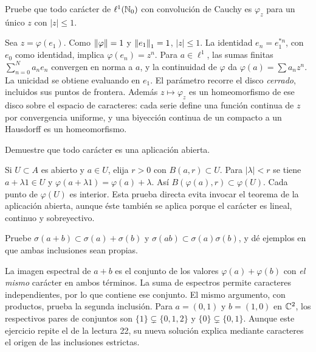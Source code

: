 \begin{ejercicio}\label{ej:v3-l24-2}
Pruebe que todo carácter de $\ell^1(\mathbb N_0)$ con convolución de Cauchy es $\varphi_z$ para un único $z$ con $|z|\le1$.
\end{ejercicio}
\begin{solucion}
Sea $z=\varphi(e_1)$. Como $\left\lVert\varphi\right\rVert=1$ y $\left\lVert e_1\right\rVert_1=1$, $|z|\le1$. La identidad $e_n=e_1^{*n}$, con $e_0$ como identidad, implica $\varphi(e_n)=z^n$. Para $a\in\ell^1$, las sumas finitas $\sum_{n=0}^Na_ne_n$ convergen en norma a $a$, y la continuidad de $\varphi$ da $\varphi(a)=\sum a_nz^n$. La unicidad se obtiene evaluando en $e_1$. El parámetro recorre el disco \emph{cerrado}, incluidos sus puntos de frontera. Además $z\mapsto\varphi_z$ es un homeomorfismo de ese disco sobre el espacio de caracteres: cada serie define una función continua de $z$ por convergencia uniforme, y una biyección continua de un compacto a un Hausdorff es un homeomorfismo.
\end{solucion}

\begin{ejercicio}\label{ej:v3-l24-3}
Demuestre que todo carácter es una aplicación abierta.
\end{ejercicio}
\begin{solucion}
Si $U\subset A$ es abierto y $a\in U$, elija $r>0$ con $B(a,r)\subset U$. Para $|\lambda|<r$ se tiene $a+\lambda1\in U$ y $\varphi(a+\lambda1)=\varphi(a)+\lambda$. Así $B(\varphi(a),r)\subset\varphi(U)$. Cada punto de $\varphi(U)$ es interior. Esta prueba directa evita invocar el teorema de la aplicación abierta, aunque éste también se aplica porque el carácter es lineal, continuo y sobreyectivo.
\end{solucion}

\begin{ejercicio}\label{ej:v3-l24-4}
Pruebe $\sigma(a+b)\subset\sigma(a)+\sigma(b)$ y $\sigma(ab)\subset\sigma(a)\sigma(b)$, y dé ejemplos en que ambas inclusiones sean propias.
\end{ejercicio}
\begin{solucion}
La imagen espectral de $a+b$ es el conjunto de los valores $\varphi(a)+\varphi(b)$ con \emph{el mismo} carácter en ambos términos. La suma de espectros permite caracteres independientes, por lo que contiene ese conjunto. El mismo argumento, con productos, prueba la segunda inclusión. Para $a=(0,1)$ y $b=(1,0)$ en $\mathbb C^2$, los respectivos pares de conjuntos son $\{1\}\subsetneq\{0,1,2\}$ y $\{0\}\subsetneq\{0,1\}$. Aunque este ejercicio repite el de la lectura 22, su nueva solución explica mediante caracteres el origen de las inclusiones estrictas.
\end{solucion}

